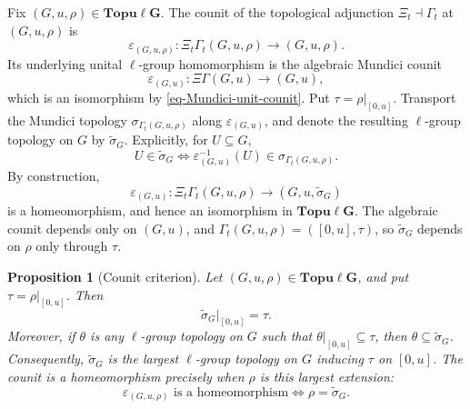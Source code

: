 \documentclass[preprint,3p]{elsarticle}
\theoremstyle{plain}
\newtheorem{prop}[thm]{Proposition}
\theoremstyle{definition}
\newcommand{\Topulg}{\mathbf{Topu\ell G}}
\numberwithin{equation}{section}
\begin{document}
Fix $(G,u,\rho)\in\Topulg$.  The counit of the topological adjunction
$\Xi_t\dashv\Gamma_t$ at $(G,u,\rho)$ is
\[
 \varepsilon_{(G,u,\rho)}\colon
 \Xi_t\Gamma_t(G,u,\rho)\longrightarrow(G,u,\rho).
\]
Its underlying unital $\ell$-group homomorphism is the algebraic
Mundici counit
\begin{equation}
\label{eq-transported-counit}
 \varepsilon_{(G,u)}\colon
 \Xi\Gamma(G,u)\longrightarrow(G,u),
\end{equation}
which is an isomorphism by \eqref{eq-Mundici-unit-counit}.
Put $\tau=\rho|_{[0,u]}$.  Transport the Mundici topology
$\sigma_{\Gamma_t(G,u,\rho)}$ along $\varepsilon_{(G,u)}$, and denote
the resulting $\ell$-group topology on $G$ by $\widetilde\sigma_G$.
Explicitly, for $U\subseteq G$,
\begin{equation}
\label{eq-transported-maximal-topology}
 U\in\widetilde\sigma_G
 \iff
 \varepsilon_{(G,u)}^{-1}(U)
 \in\sigma_{\Gamma_t(G,u,\rho)}.
\end{equation}
By construction,
\begin{equation}
\label{eq-transported-counit-homeomorphism}
 \varepsilon_{(G,u)}\colon
 \Xi_t\Gamma_t(G,u,\rho)\longrightarrow
 (G,u,\widetilde\sigma_G)
\end{equation}
is a homeomorphism, and hence an isomorphism in $\Topulg$.
The algebraic counit depends only on $(G,u)$, and
$\Gamma_t(G,u,\rho)=([0,u],\tau)$, so $\widetilde\sigma_G$ depends
on $\rho$ only through $\tau$.

\begin{prop}[Counit criterion]
\label{prop-transported-maximality}
Let $(G,u,\rho)\in\Topulg$, and put
$\tau=\rho|_{[0,u]}$.  Then
\begin{equation}
\label{eq-transported-interval-exactness}
 \widetilde\sigma_G|_{[0,u]}=\tau.
\end{equation}
Moreover, if $\theta$ is any $\ell$-group topology on $G$ such that
$\theta|_{[0,u]}\subseteq\tau$, then $\theta\subseteq\widetilde\sigma_G$.
Consequently, $\widetilde\sigma_G$ is the largest $\ell$-group topology
on $G$ inducing $\tau$ on $[0,u]$.
The counit is a homeomorphism precisely when $\rho$ is this largest
extension:
\begin{equation}
\label{eq-counit-Mundici-maximality}
 \varepsilon_{(G,u,\rho)}
 \text{ is a homeomorphism}
 \iff \rho=\widetilde\sigma_G.
\end{equation}
\end{prop}
\end{document}

